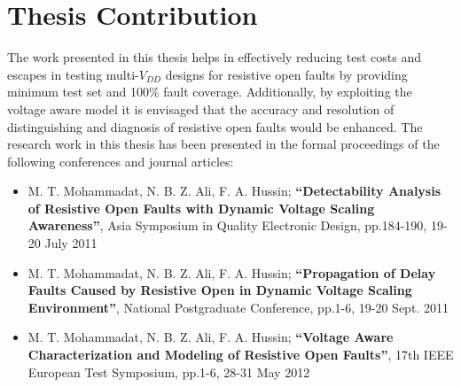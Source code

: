 \section{Thesis Contribution}
The work presented in this thesis helps in effectively reducing test costs and escapes in testing multi-$V_{DD}$ designs for resistive open faults by providing minimum test set and 100\% fault coverage. Additionally, by exploiting the voltage aware model it is envisaged that the accuracy and resolution of distinguishing and diagnosis of resistive open faults would be enhanced. The research work in this thesis has been presented in the formal proceedings of the following conferences and journal articles:
\begin{itemize}
	\item M. T. Mohammadat, N. B. Z. Ali, F. A. Hussin; \textbf{``Detectability Analysis of Resistive Open Faults with Dynamic Voltage Scaling Awareness''}, Asia Symposium in Quality Electronic Design, pp.184-190, 19-20 July 2011
	\item M. T. Mohammadat, N. B. Z. Ali, F. A. Hussin; \textbf{``Propagation of Delay Faults Caused by Resistive Open in Dynamic Voltage Scaling Environment''}, National Postgraduate Conference, pp.1-6, 19-20 Sept. 2011
	\item M. T. Mohammadat, N. B. Z. Ali, F. A. Hussin; \textbf{``Voltage Aware Characterization and Modeling of Resistive Open Faults''}, 17th IEEE European Test Symposium, pp.1-6, 28-31 May 2012
\end{itemize}
